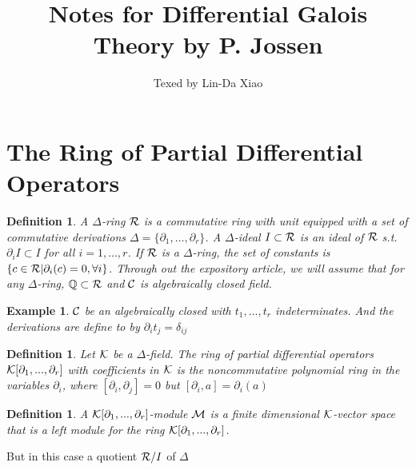 \documentclass[11pt]{article}
\title{\bf Notes for Differential Galois Theory by P. Jossen}
\author{Texed by Lin-Da Xiao} %
\newtheorem{dfn}[thm]{Definition}
\newtheorem{ex}[thm]{Example}
\newcommand{\pd}{\partial}
\newcommand{\ratl}{\mathbb Q}
\newcommand{\calc}{{\cal C}}
\newcommand{\calk}{{\cal K}}
\newcommand{\calm}{{\cal M}}
\newcommand{\calr}{{\cal R}}
\begin{document}
\maketitle
\tableofcontents
\newpage
\section{The Ring of Partial Differential Operators}
\begin{dfn}
A $\Delta$-ring $\calr$ is a commutative ring with unit equipped with a set of commutative derivations $\Delta=\{\pd_1,...,\pd_r\}$. A $\Delta$-ideal $I\subset \calr$ is an ideal of $\calr$ s.t.  $\pd_i I\subset I$ for all $i=1,...,r$. If $\calr$ is a $\Delta$-ring, the set of constants is $\{c\in \calr|\pd_i(c)=0, \forall i\}$. Through out the expository article, we will assume that for any $\Delta$-ring, $\ratl\subset \calr$ and $\calc$ is algebraically closed field.
\end{dfn}
\begin{ex}
$\calc$ be an algebraically closed with $t_1,...,t_r$ indeterminates. And the derivations are define to by $\pd_it_j=\delta_{ij}$ 
\end{ex}

\begin{dfn}
Let $\calk$ be a $\Delta$-field. The ring of partial differential operators $\calk[\pd_1,...,\pd_r]$ with coefficients in $\calk$ is the noncommutative polynomial ring in the variables $\pd_i$, where $[\pd_i,\pd_j]=0$ but $[\pd_i, a]=\pd_i(a)$
\end{dfn}

\begin{dfn}
A $\calk[\pd_1,...,\pd_r]$-module $\calm$ is a finite dimensional $\calk$-vector space that is a left module for the ring $\calk[\pd_1,...,\pd_r]$.
\end{dfn}

But in this case a quotient $\calr/I$ of $\Delta$
\end{document}
